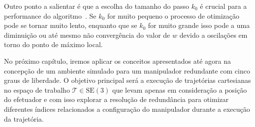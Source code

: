 Outro ponto a salientar é que a escolha do tamanho do passo \(k_0\) é crucial
para a performance do algoritmo~\cite{siciliano_springer_2008}. Se \(k_0\) 
for muito pequeno o processo de otimização pode se tornar muito lento, enquanto 
que se \(k_0\) for muito grande isso pode a uma diminuição ou até
 mesmo não convergência do valor de \(w\) devido a oscilações em torno do ponto 
 de máximo local.

No próximo capítulo, iremos aplicar os conceitos apresentados até agora na
concepção de um ambiente simulado para um manipulador redundante com cinco
graus de liberdade. O objetivo principal será a execução de trajetórias
cartesianas no espaço de trabalho \(\mathcal{T} \in \text{SE}(3)\) que levam
apenas em consideração a posição do efetuador e com isso explorar a resolução
de redundância para otimizar diferentes índices relacionados a configuração do
manipulador durante a execução da trajetória.
